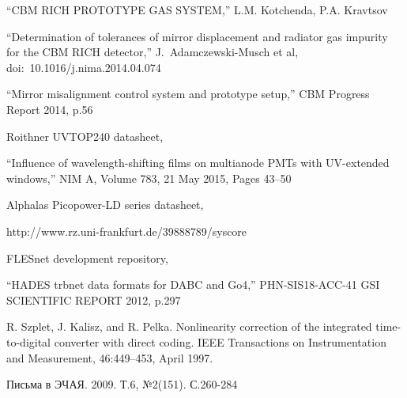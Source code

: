 \begin{thebibliography}{99}
``CBM RICH PROTOTYPE GAS SYSTEM,''
L.M. Kotchenda, P.A. Kravtsov

``Determination of tolerances of mirror displacement and radiator gas impurity for the CBM RICH detector,''
J.~Adamczewski-Musch et al,
doi:~10.1016/j.nima.2014.04.074

``Mirror misalignment control system and prototype setup,''
CBM Progress Report 2014, p.56

Roithner UVTOP240 datasheet,

``Influence of wavelength-shifting films on multianode PMTs with UV-extended windows,''
NIM A, Volume 783, 21 May 2015, Pages 43–50

Alphalas Picopower-LD series datasheet,

http://www.rz.uni-frankfurt.de/39888789/syscore



FLESnet development repository,

``HADES trbnet data formats for DABC and Go4,''
PHN-SIS18-ACC-41
GSI SCIENTIFIC REPORT 2012, p.297

R. Szplet, J. Kalisz, and R. Pelka. Nonlinearity correction of the integrated time-to-digital converter with direct coding. IEEE Transactions on Instrumentation and Measurement, 46:449–453, April 1997.

Письма в ЭЧАЯ. 2009. Т.6, №2(151). С.260-284


\end{thebibliography}
